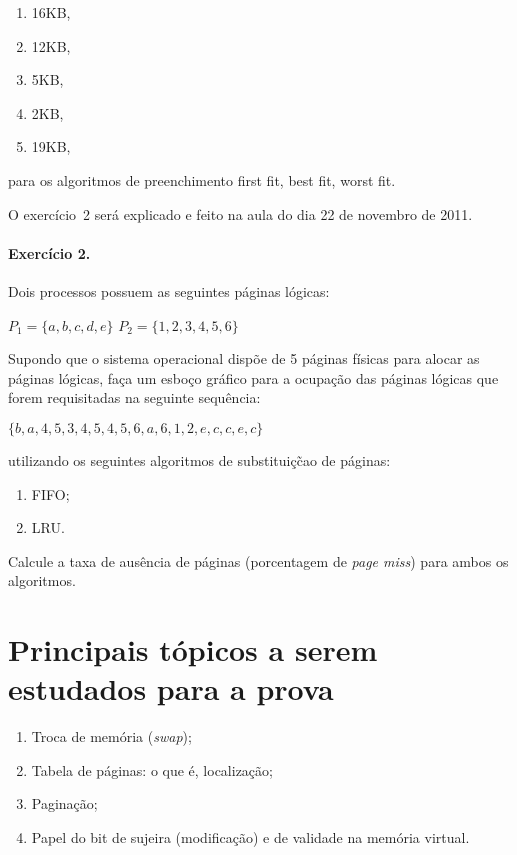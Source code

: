 \begin{enumerate}
\item  16KB,
\item  12KB,
\item 5KB,
\item 2KB,
\item  19KB,
\end{enumerate}
para os algoritmos de preenchimento first fit, best fit, worst fit.

{\large O exerc\'icio~2 ser\'a explicado e feito na aula do dia 22 de novembro de 2011.}
\paragraph{Exerc\'icio 2.} Dois processos possuem as seguintes p\'aginas
l\'ogicas:



\begin{center}
  $P_1= \{a,b,c,d,e\}$
  $P_2= \{1,2,3,4,5,6\}$
\end{center}

Supondo que o sistema operacional disp\~oe de 5 p\'aginas f\'isicas para
alocar as p\'aginas l\'ogicas, fa\c{c}a um esbo\c{c}o gr\'afico para a ocupa\c{c}\~ao das
p\'aginas l\'ogicas que forem requisitadas na seguinte sequ\^encia:

\begin{center}
  $\{b,a,4,5,3,4,5,4,5,6,a,6,1,2,e,c,c,e,c\}$
\end{center}
utilizando os seguintes algoritmos de substitui\c{c}\~cao de p\'aginas:\\
\begin{enumerate}
\item FIFO;
\item LRU.
\end{enumerate}

Calcule a taxa de aus\^encia de p\'aginas (porcentagem de {\em page miss})
para ambos os algoritmos.

\section*{Principais t\'opicos a serem estudados para a prova}

\begin{enumerate}
\item Troca de memória ({\em swap});
\item Tabela de páginas: o que é, localização;
\item Pagina\c{c}\~ao;
\item Papel do bit de sujeira (modificação) e de validade na memória virtual.
\end{enumerate}



